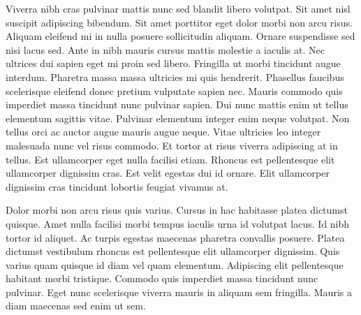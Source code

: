 Viverra nibh cras pulvinar mattis nunc sed blandit libero volutpat. Sit amet nisl suscipit adipiscing bibendum. Sit amet porttitor eget dolor morbi non arcu risus. Aliquam eleifend mi in nulla posuere sollicitudin aliquam. Ornare suspendisse sed nisi lacus sed. Ante in nibh mauris cursus mattis molestie a iaculis at. Nec ultrices dui sapien eget mi proin sed libero. Fringilla ut morbi tincidunt augue interdum. Pharetra massa massa ultricies mi quis hendrerit. Phasellus faucibus scelerisque eleifend donec pretium vulputate sapien nec. Mauris commodo quis imperdiet massa tincidunt nunc pulvinar sapien. Dui nunc mattis enim ut tellus elementum sagittis vitae. Pulvinar elementum integer enim neque volutpat. Non tellus orci ac auctor augue mauris augue neque. Vitae ultricies leo integer malesuada nunc vel risus commodo. Et tortor at risus viverra adipiscing at in tellus. Est ullamcorper eget nulla facilisi etiam. Rhoncus est pellentesque elit ullamcorper dignissim cras. Est velit egestas dui id ornare. Elit ullamcorper dignissim cras tincidunt lobortis feugiat vivamus at.

Dolor morbi non arcu risus quis varius. Cursus in hac habitasse platea dictumst quisque. Amet nulla facilisi morbi tempus iaculis urna id volutpat lacus. Id nibh tortor id aliquet. Ac turpis egestas maecenas pharetra convallis posuere. Platea dictumst vestibulum rhoncus est pellentesque elit ullamcorper dignissim. Quis varius quam quisque id diam vel quam elementum. Adipiscing elit pellentesque habitant morbi tristique. Commodo quis imperdiet massa tincidunt nunc pulvinar. Eget nunc scelerisque viverra mauris in aliquam sem fringilla. Mauris a diam maecenas sed enim ut sem.
